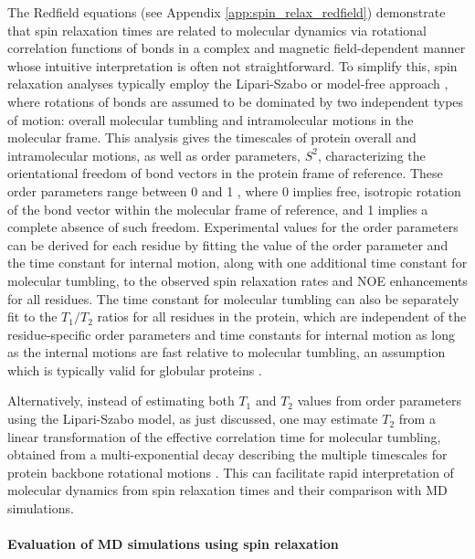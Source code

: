 \documentclass[9pt,review]{livecoms}
\begin{document}
The Redfield equations \cite{redfield_theory_1965} (see Appendix \ref{app:spin_relax_redfield}) demonstrate that spin relaxation times are related to molecular dynamics via rotational correlation functions of bonds in a complex and magnetic field-dependent manner whose intuitive interpretation is often not straightforward.
To simplify this,  spin relaxation analyses \cite{best_determination_2004,showalter_toward_2007,showalter_validation_2007,maragakis_microsecond_2008,trbovic_structural_2008} typically employ the Lipari-Szabo or model-free approach \cite{halle1981interpretation,lipari_model-free_1982}, where rotations of bonds are assumed to be dominated by two independent types of motion: overall molecular tumbling and intramolecular motions in the molecular frame.
This analysis gives the timescales of protein overall and intramolecular motions, as well as order parameters, $S^2$, characterizing the orientational freedom of bond vectors in the protein frame of reference.
These order parameters range between 0 and 1 \cite{lipari_model-free_1982}, where 0 implies free, isotropic rotation of the bond vector within the molecular frame of reference, and 1 implies a complete absence of such freedom.
Experimental values for the order parameters can be derived for each residue by fitting the value of the order parameter and the time constant for internal motion, along with one additional time constant for molecular tumbling, to the observed spin relaxation rates and NOE enhancements for all residues.
The time constant for molecular tumbling can also be separately fit to the $T_1/T_2$ ratios for all residues in the protein, which are independent of the residue-specific order parameters and time constants for internal motion as long as the internal motions are fast relative to molecular tumbling, an assumption which is typically valid for globular proteins \cite{virtanen_heterogeneous_2020}.

Alternatively, instead of estimating both $T_1$ and $T_2$ values from order parameters using the Lipari-Szabo model, as just discussed, one may estimate $T_2$ from a linear transformation of the effective correlation time for molecular tumbling, obtained from a multi-exponential decay describing the multiple timescales for protein backbone rotational motions \cite{nencini_rapid_2024}.
This can facilitate rapid interpretation of molecular dynamics from spin relaxation times and their comparison with MD simulations.

\paragraph{Evaluation of MD simulations using spin relaxation}
\end{document}
